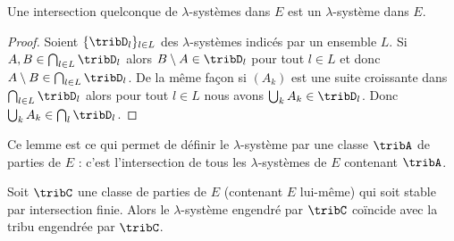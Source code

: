 \begin{lemma}
	Une intersection quelconque de \( \lambda\)-systèmes dans \( E\) est un \( \lambda\)-système dans \( E\).
\end{lemma}

\begin{proof}
	Soient \( \{ \tribD_l \}_{l\in L}\) des \( \lambda\)-systèmes indicés par un ensemble \( L\). Si \( A,B\in\bigcap_{l\in L}\tribD_l\) alors \( B\setminus A\in\tribD_l\) pour tout \( l\in L\) et donc \( A\setminus B\in\bigcap_{l\in L}\tribD_l\). De la même façon si \( (A_k)\) est une suite croissante dans \( \bigcap_{l\in L}\tribD_l\) alors pour tout \( l\in L\) nous avons \( \bigcup_kA_k\in\tribD_l\). Donc \( \bigcup_kA_k\in\bigcap_l\tribD_l\).
\end{proof}
Ce lemme est ce qui permet de définir le \( \lambda\)-système  par une classe \( \tribA\) de parties de \( E\) : c'est l'intersection de tous les \( \lambda\)-systèmes de \( E\) contenant \( \tribA\).

\begin{lemma}   \label{LemLUmopaZ}
	Soit \( \tribC\) une classe de parties de \( E\) (contenant \( E\) lui-même) qui soit stable par intersection finie. Alors le \( \lambda\)-système engendré par \( \tribC\) coïncide avec la tribu engendrée par \( \tribC\).
\end{lemma}

